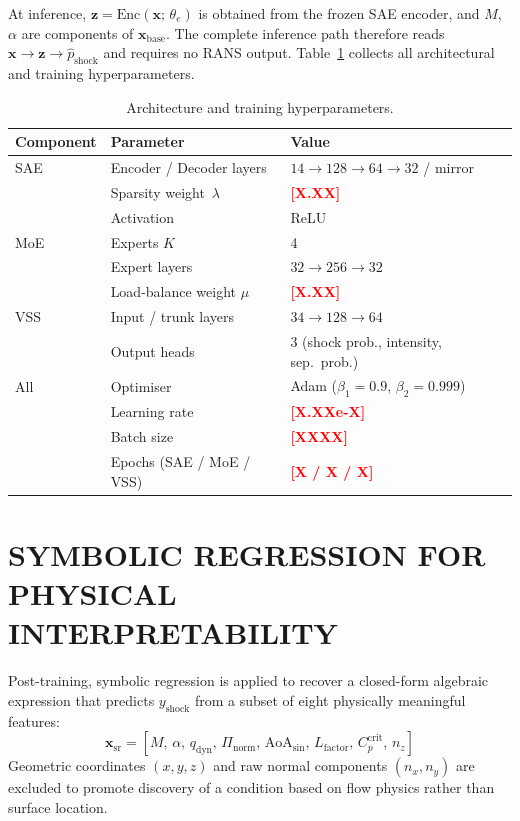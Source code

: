 \documentclass{WCCM-ECCOMAS_2026_Full_Paper}
\newcommand{\result}[1]{\textcolor{red}{\textbf{[#1]}}}
\begin{document}
At inference, $\mathbf{z}=\mathrm{Enc}(\mathbf{x};\,\theta_{e})$ is
obtained from the frozen SAE encoder, and $M$, $\alpha$ are
components of $\mathbf{x}_{\mathrm{base}}$.  The complete inference
path therefore reads $\mathbf{x}\to\mathbf{z}\to\hat{p}_{\mathrm{shock}}$
and requires no RANS output.  Table~\ref{tab:arch} collects all
architectural and training hyperparameters.

\begin{table}[ht]
\centering
\caption{Architecture and training hyperparameters.}
\label{tab:arch}
\begin{tabular}{lll}
\toprule
\textbf{Component} & \textbf{Parameter} & \textbf{Value} \\
\midrule
SAE   & Encoder / Decoder layers  & $14{\to}128{\to}64{\to}32$ / mirror \\
      & Sparsity weight~$\lambda$ & \result{X.XX} \\
      & Activation                & ReLU \\
\midrule
MoE   & Experts $K$               & 4 \\
      & Expert layers             & $32{\to}256{\to}32$ \\
      & Load-balance weight $\mu$ & \result{X.XX} \\
\midrule
VSS   & Input / trunk layers      & $34{\to}128{\to}64$ \\
      & Output heads              & 3 (shock prob., intensity, sep.\ prob.) \\
\midrule
All   & Optimiser                 & Adam ($\beta_1=0.9$, $\beta_2=0.999$) \\
      & Learning rate             & \result{X.XXe-X} \\
      & Batch size                & \result{XXXX} \\
      & Epochs (SAE / MoE / VSS)  & \result{X / X / X} \\
\bottomrule
\end{tabular}
\end{table}

\section{SYMBOLIC REGRESSION FOR PHYSICAL INTERPRETABILITY}
\label{sec:sr}

Post-training, symbolic regression is applied to recover a closed-form
algebraic expression that predicts $y_{\mathrm{shock}}$ from a subset
of eight physically meaningful features:
\[\mathbf{x}_{\mathrm{sr}} = [M,\,\alpha,\,q_{\mathrm{dyn}},\,
\Pi_{\mathrm{norm}},\,\mathrm{AoA}_{\sin},\,L_{\mathrm{factor}},\,
C_{p}^{\mathrm{crit}},\,n_{z}]\] Geometric coordinates $(x,y,z)$ and
raw normal components $(n_x,n_y)$ are excluded to promote discovery
of a condition based on flow physics rather than surface location.
\end{document}
